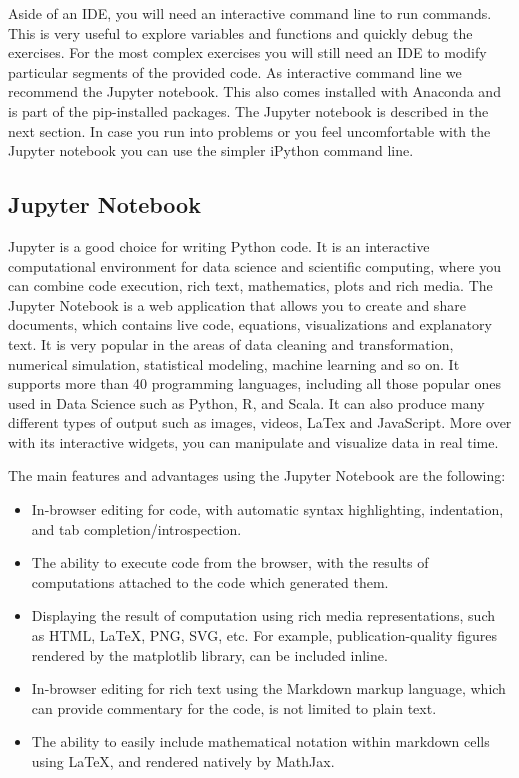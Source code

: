 Aside of an IDE, you will need an interactive command line to run commands. This is very useful to explore variables and functions and quickly debug the exercises. For the most complex exercises you will still need an IDE to modify particular segments of the provided code. As interactive command line we recommend the Jupyter notebook. This also comes installed with Anaconda and is part of the pip-installed packages. The Jupyter notebook is described in the next section. In case you run into problems or you feel uncomfortable with the Jupyter notebook you can use the simpler iPython command line.

\subsection{Jupyter Notebook}

Jupyter is a good choice for writing Python code. It is an interactive computational environment for data science and scientific computing, where you can combine code execution, rich text, mathematics, plots and rich media. The Jupyter Notebook is a web application that allows you to create and share documents, which contains live code, equations, visualizations and explanatory text. It is very popular in the areas of data cleaning and transformation, numerical simulation, statistical modeling, machine learning and so on. It supports more than 40 programming languages, including all those popular ones used in Data Science such as Python, R, and Scala. It can also produce many different types of output such as images, videos, LaTex and JavaScript. More over with its interactive widgets, you can manipulate and visualize data in real time.

\noindent The main features and advantages using the Jupyter Notebook are the
following:

\begin{itemize}

\item In-browser editing for code, with automatic syntax highlighting, indentation, and tab completion/introspection.

\item The ability to execute code from the browser, with the results of computations attached to the code which generated them.

\item Displaying the result of computation using rich media representations, such as HTML, LaTeX, PNG, SVG, etc. For example, publication-quality figures rendered by the matplotlib library, can be included inline.

\item In-browser editing for rich text using the Markdown markup language, which can provide commentary for the code, is not limited to plain text.

\item The ability to easily include mathematical notation within markdown cells using LaTeX, and rendered natively by MathJax.

\end{itemize}

